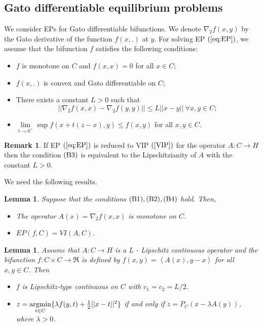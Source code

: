 \documentclass{aims}
\newtheorem{lemma}[theorem]{Lemma}
\theoremstyle{definition}
\newtheorem{remark}{Remark}
\begin{document}
\subsection{Gato differentiable equilibrium problems}
We consider EPs for Gato differentiable bifunctions. We denote $\nabla_2 f(x,y)$ by the Gato derivative of 
the function $f(x,.)$ at $y$. For solving EP $(\ref{eq:EP})$, we assume that the bifunction $f$ satisfies the following conditions:
\begin{itemize}
\item[\rm (B1).] $f$ is monotone on $C$ and $f(x,x)=0$ for all $x\in C$;
\item [\rm (B2).] $f(x,.)$ is convex and Gato differentiable on $C$;
\item [\rm (B3).] There exists a constant $L>0$ such that 
$$||\nabla_2 f (x,x)-\nabla_2 f (y,y)||\le L||x-y||~\forall x,y\in C;$$
\item [\rm (B4).] $\lim\limits_{t\to 0^+}\sup f(x+t(z-x),y)\le f(x,y)$ for all $x,y\in C$.
\end{itemize}  
\begin{remark}
If EP $(\ref{eq:EP})$ is reduced to VIP $(\ref{VIP})$ for the operator $A:C\to H$ then the condition $\rm (B3)$ is equivalent to the 
Lipschitzianity of $A$ with the constant $L>0$.
\end{remark}
We need the following results.
\begin{lemma} \cite[Lemma 2]{LSV2011}\label{lem3}
Suppose that the conditions $\rm (B1), (B2), (B4)$ hold. Then, 
\begin{itemize}
\item [$\rm i.$] The operator $A(x)=\nabla_2 f(x,x)$ is monotone on $C$.
\item [$\rm ii.$] $EP(f,C)=VI(A,C)$.
\end{itemize}
\end{lemma}
\begin{lemma}\label{lem4}
Assume that $A:C\to H$ is a L - Lipschitz continuous operator and the bifunction $f:C\times C\to \Re$ is defined by $f(x,y)=\left\langle A(x),y-x\right\rangle$ 
for all $x,y\in C$. Then
\begin{itemize}
\item [$\rm i.$] $f$ is Lipschitz-type continuous on $C$ with $c_1=c_2=L/2$.
\item [$\rm ii.$] $z=\underset{t\in C}{\rm argmin} \{ \lambda f(y,t)+\frac{1}{2}||x-t||^2\}$ if and only if $z=P_C(x-\lambda A(y))$, where $\lambda>0$.
\end{itemize}
\end{lemma}
\end{document}
